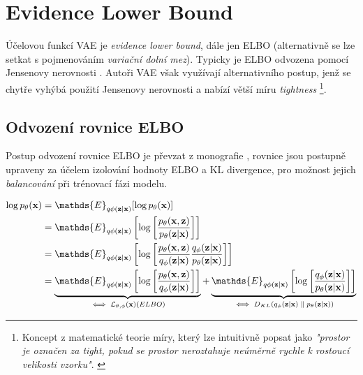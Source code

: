 \section{Evidence Lower Bound}
\label{sec:vae_objective}
Účelovou funkcí VAE je \emph{evidence lower bound}, dále jen ELBO (alternativně se lze setkat s pojmenováním \emph{variační dolní mez}).
Typicky je ELBO odvozena pomocí Jensenovy nerovnosti \cite[Sekce 4.2]{Wasserman2013}.
Autoři VAE \cite{Kingma2014} však využívají alternativního postup, jenž se chytře vyhýbá použití Jensenovy nerovnosti a nabízí větší míru \emph{tightness}
\footnote{Koncept z matematické teorie míry, který lze intuitivně popsat jako \emph{"prostor je označen za tight, pokud se prostor neroztahuje neúměrně rychle k rostoucí velikosti vzorku"}. \cite{Topsoee1974}}. 

\subsection{Odvození rovnice ELBO}
Postup odvození rovnice ELBO je převzat z monografie \textcite{Kingma2019}, rovnice jsou postupně upraveny za účelem izolování hodnoty ELBO a KL divergence, pro možnost jejich \emph{balancování} při trénovací fázi modelu.

\begin{align}
    \log p_\theta(\textbf{x}) &= \mathds{E}_{q\phi(\textbf{z}\mid\textbf{x})}[\log p_\theta(\textbf{x})] \\
                              &= \mathds{E}_{q\phi(\textbf{z}\mid\textbf{x})} \left[ \log \left[ \frac{p_\theta(\textbf{x}, \textbf{z})}{p_\theta(\textbf{z}\mid\textbf{x})} \right] \right] \\
                              &= \mathds{E}_{q\phi(\textbf{z}\mid\textbf{x})} \left[ \log \left[ \frac{p_\theta(\textbf{x}, \textbf{z})}{q_\phi(\textbf{z}\mid\textbf{x})} \frac{q_\phi(\textbf{z}\mid\textbf{x})}{p_\theta(\textbf{z}\mid\textbf{x})} \right] \right] \\
                              &= \underbrace{ \mathds{E}_{q\phi(\textbf{z}\mid\textbf{x})} \left[ \log \left[ \frac{p_\theta(\textbf{x}, \textbf{z})}{q_\phi(\textbf{z}\mid\textbf{x})} \right] \right] }_\text{$ \iff \mathcal{L}_{\theta,\phi}(\textbf{x}) (ELBO)$} 
                              +  \underbrace{ \mathds{E}_{q\phi(\textbf{z}\mid\textbf{x})} \left[ \log \left[ \frac{q_\phi(\textbf{z}\mid\textbf{x})}{p_\theta(\textbf{z}\mid\textbf{x})} \right] \right] }_\text{$\iff D_{KL}(q_\phi(\textbf{z}\mid\textbf{x})\parallel p_\theta(\textbf{z}\mid\textbf{x}))$} \\ \label{eq:elbo_kl}
\end{align}

